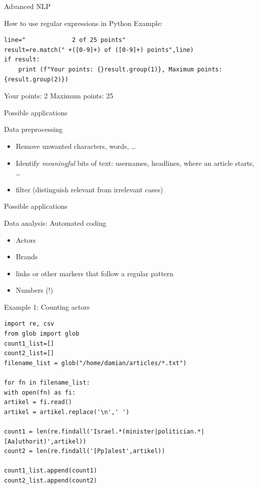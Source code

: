 \documentclass[handout]{beamer}
\begin{document}
\begin{section}{Advanced NLP}
\begin{frame}[fragile]{How to use regular expressions in Python}
Example:
\begin{lstlisting}
line="             2 of 25 points"
result=re.match(" +([0-9]+) of ([0-9]+) points",line)
if result:
    print (f"Your points: {}result.group(1)}, Maximum points: {result.group(2)})
\end{lstlisting}
Your points: 2 Maximum points: 25
\end{frame}



\begin{frame}{Possible applications}
\begin{block}{Data preprocessing}
\begin{itemize}
\item Remove unwanted characters, words, \ldots
\item Identify \emph{meaningful} bits of text: usernames, headlines, where an article starts, \ldots
\item filter (distinguish relevant from irrelevant cases)
\end{itemize}
\end{block}
\end{frame}


\begin{frame}{Possible applications}
\begin{block}{Data analysis: Automated coding}
\begin{itemize}
\item Actors
\item Brands
\item links or other markers that follow a regular pattern
\item Numbers (!)
\end{itemize}
\end{block}
\end{frame}

\begin{frame}{Example 1: Counting actors}
\begin{lstlisting}
import re, csv
from glob import glob
count1_list=[]
count2_list=[]
filename_list = glob("/home/damian/articles/*.txt")

for fn in filename_list:
with open(fn) as fi:
artikel = fi.read()
artikel = artikel.replace('\n',' ')

count1 = len(re.findall('Israel.*(minister|politician.*|[Aa]uthorit)',artikel))
count2 = len(re.findall('[Pp]alest',artikel))

count1_list.append(count1)
count2_list.append(count2)


\end{lstlisting}
\end{frame}
\end{section}
\end{document}
